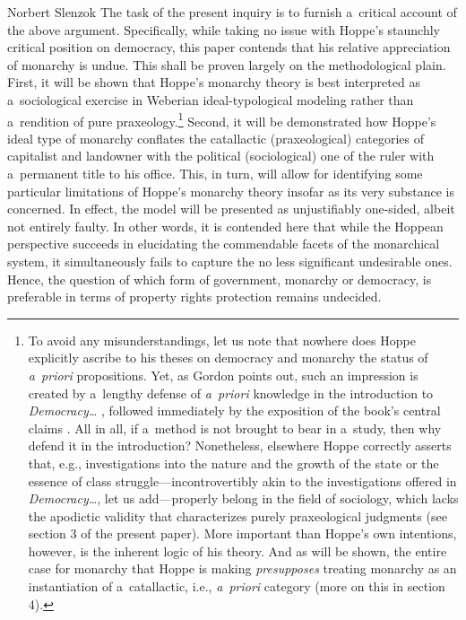 \begin{artengenv}{Norbert Slenzok}
The task of the present inquiry is to furnish a~critical account of the above argument. Specifically, while taking no issue with Hoppe's staunchly critical position on democracy, this paper contends that his relative appreciation of monarchy is undue. This shall be proven largely on the methodological plain. First, it will be shown that Hoppe's monarchy theory is best interpreted as a~sociological exercise in Weberian ideal-typological modeling rather than a~rendition of pure praxeology.\footnote{To avoid any misunderstandings, let us note that nowhere does Hoppe explicitly ascribe to his theses on democracy and monarchy the status of \textit{a~priori} propositions. Yet, as Gordon 
\parencite*[][pp.98–99]{gordon_austro-libertarian_2017} %
 points out, such an impression is created by a~lengthy defense of \textit{a~priori} knowledge in the introduction to \textit{Democracy…} 
\parencite[][pp.xv–xix]{hoppe_democracy_2007}, %
 followed immediately by the exposition of the book's central claims 
\parencite[][pp.xix–xxi]{hoppe_democracy_2007}. %
 All in all, if a~method is not brought to bear in a~study, then why defend it in the introduction? Nonetheless, elsewhere Hoppe 
\parencites*[][p.33]{hoppe_economics_2006}[][p.16]{hoppe_short_2015} %
 correctly asserts that, e.g., investigations into the nature and the growth of the state or the essence of class struggle---incontrovertibly akin to the investigations offered in \textit{Democracy…}, let us add---properly belong in the field of sociology, which lacks the apodictic validity that characterizes purely praxeological judgments (see section 3 of the present paper). More important than Hoppe's own intentions, however, is the inherent logic of his theory. And as will be shown, the entire case for monarchy that Hoppe is making \textit{presupposes} treating monarchy as an instantiation of a~catallactic, i.e., \textit{a~priori} category (more on this in section 4). } Second, it will be demonstrated how Hoppe's ideal type of monarchy conflates the catallactic (praxeological) categories of capitalist and landowner with the political (sociological) one of the ruler with a~permanent title to his office. This, in turn, will allow for identifying some particular limitations of Hoppe's monarchy theory insofar as its very substance is concerned. In effect, the model will be presented as unjustifiably one-sided, albeit not entirely faulty. In other words, it is contended here that while the Hoppean perspective succeeds in elucidating the commendable facets of the monarchical system, it simultaneously fails to capture the no less significant undesirable ones. Hence, the question of which form of government, monarchy or democracy, is preferable in terms of property rights protection remains undecided.




\end{artengenv}
